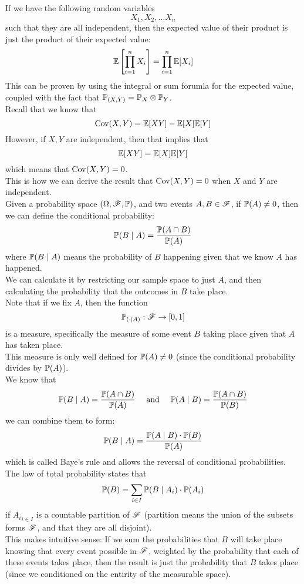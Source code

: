 \documentclass[12pt]{article}
\begin{document}
    If we have the following random
    variables
    \[ X_1, X_2, \dots X_n \]
    such that they are all independent,
    then the expected value of their
    product is just the product
    of their expected value:
    \[ \mathbb{E}\left[ \prod_{i=1}^{n}
    X_i \right] = \prod_{i=1}^{n}\mathbb{E}[X_i] \]
    This can be proven by 
    using the integral or sum
    forumla for the expected
    value, coupled with the fact that
    $ \mathbb{P}_{(X, Y)}
    = \mathbb{P}_X \otimes \mathbb{P}_Y $. \\
    
    Recall that we know that
    \[ \text{Cov}(X, Y) = \mathbb{E}[XY] - \mathbb{E}[X]\mathbb{E}[Y] \]
    However, if $X, Y$
    are independent,
    then that implies that 
    \[ \mathbb{E}[XY] = \mathbb{E}[X]\mathbb{E}[Y] \]
    which means that $\text{Cov}(X, Y) = 0$. \\
    This is how we can derive the
    result that $\text{Cov}(X, Y) = 0$
    when $X$ and $Y$
    are independent. \\

    Given a probability space
    $(\Omega, \mathscr{F}, \mathbb{P})$,
    and two events $A, B \in \mathscr{F}$,
    if $\mathbb{P}(A) \neq 0$,
    then we can define the conditional
    probability:
    \[ \mathbb{P}(B \mid A)
    = \dfrac{\mathbb{P}(A \cap B)}{\mathbb{P}(A)} \]
    where $\mathbb{P}(B \mid A)$
    means the probability of $B$
    happening given that we know $A$
    has happened. \\
    We can calculate it by restricting
    our sample space to just $A$,
    and then calculating the probability
    that the outcomes in $B$
    take place. \\

    Note that if we fix $A$,
    then the function
    \[ \mathbb{P}_{(\cdot \mid A)}: \mathscr{F} \to
    [0, 1] \]
    is a measure,
    specifically the measure of some
    event $B$ taking place given
    that $A$ has taken place. \\
    This measure is only well defined
    for $\mathbb{P}(A) \neq 0$
    (since the conditional probability
    divides by $\mathbb{P}(A)$). \\

    We know that
    \[ \mathbb{P}(B \mid A)
    = \dfrac{\mathbb{P}(A \cap B)}{\mathbb{P}(A)} 
    \quad \text{ and } \quad 
    \mathbb{P}(A \mid B)
    = \dfrac{\mathbb{P}(A \cap B)}{\mathbb{P}(B)} \]
    we can combine them to form:
    \[ \mathbb{P}(B \mid A)
    = \dfrac{\mathbb{P}(A \mid B) \cdot \mathbb{P}(B)}
    {\mathbb{P}(A)} \]
    which is called Baye's rule and allows
    the reversal of conditional
    probabilities. \\

    The law of total probability states that
    \[ \mathbb{P}(B)
    = \sum_{i \in I}\mathbb{P}(B \mid A_i)
    \cdot \mathbb{P}(A_i) \]
    if ${A_i}_{i \in I}$
    is a countable partition of $\mathscr{F}$
    (partition means the union of the subsets
    forms $\mathscr{F}$, and that they are all
    disjoint). \\
    This makes intuitive sense:
    If we sum the probabilities that $B$
    will take place knowing
    that every event possible in $\mathscr{F}$,
    weighted by the probability
    that each of these events takes place,
    then the result is just the probability
    that $B$ takes place (since we conditioned
    on the entirity of the 
    measurable space). \\
\end{document}
